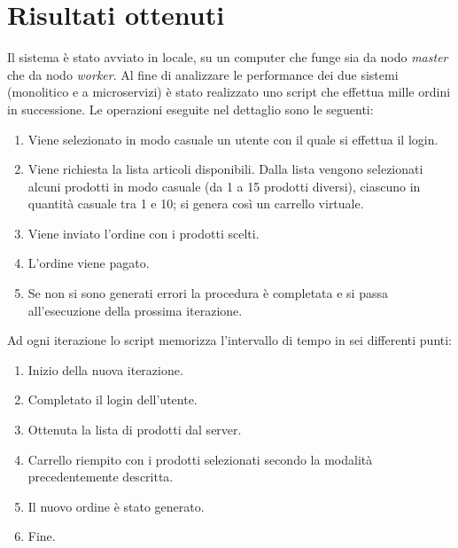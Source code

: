 \chapter{Risultati ottenuti}

	Il sistema è stato avviato in locale, su un computer che funge sia da nodo \emph{master} che da nodo \emph{worker}.
	Al fine di analizzare le performance dei due sistemi (monolitico e a microservizi) è stato realizzato uno script che effettua mille ordini in successione.
	Le operazioni eseguite nel dettaglio sono le seguenti:
	
	\begin{enumerate}
		\item Viene selezionato in modo casuale un utente con il quale si effettua il login.
		
		\item Viene richiesta la lista articoli disponibili.
			Dalla lista vengono selezionati alcuni prodotti in modo casuale (da 1 a 15 prodotti diversi), ciascuno in quantità casuale tra 1 e 10;
			si genera così un carrello virtuale.
			
		\item Viene inviato l'ordine con i prodotti scelti.
		
		\item L'ordine viene pagato.
		
		\item Se non si sono generati errori la procedura è completata e si passa all'esecuzione della prossima iterazione.
	\end{enumerate}
	
	Ad ogni iterazione lo script memorizza l'intervallo di tempo in sei differenti punti:
	
	\begin{enumerate}
		\item Inizio della nuova iterazione.
		
		\item Completato il login dell'utente.
		
		\item Ottenuta la lista di prodotti dal server.
		
		\item Carrello riempito con i prodotti selezionati secondo la modalità precedentemente descritta.
		
		\item Il nuovo ordine è stato generato.
		
		\item Fine.
	\end{enumerate}
	
